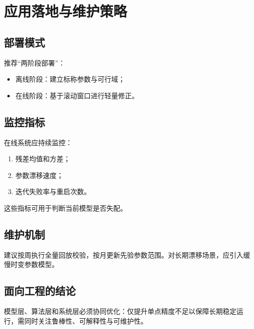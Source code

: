 \chapter{应用落地与维护策略}

\section{部署模式}
推荐“两阶段部署”：
\begin{itemize}
  \item 离线阶段：建立标称参数与可行域；
  \item 在线阶段：基于滚动窗口进行轻量修正。
\end{itemize}

\section{监控指标}
在线系统应持续监控：
\begin{enumerate}
  \item 残差均值和方差；
  \item 参数漂移速度；
  \item 迭代失败率与重启次数。
\end{enumerate}
这些指标可用于判断当前模型是否失配。

\section{维护机制}
建议按周执行全量回放校验，按月更新先验参数范围。对长期漂移场景，应引入缓慢时变参数模型。

\section{面向工程的结论}
模型层、算法层和系统层必须协同优化：仅提升单点精度不足以保障长期稳定运行，需同时关注鲁棒性、可解释性与可维护性。
